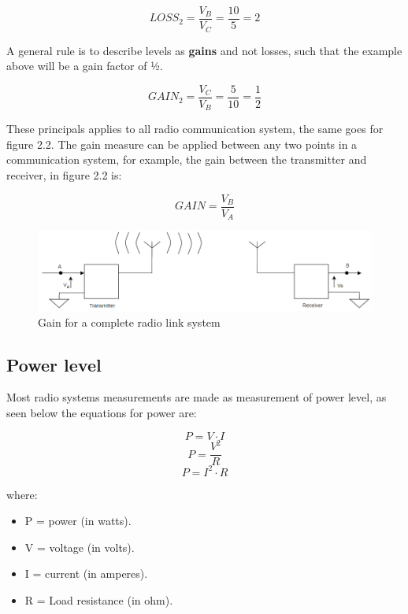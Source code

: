$$LOSS_2 = \frac{V_B}{V_C} = \frac{10}{5} = 2$$

A general rule is to describe levels as \textbf{gains} and not losses, such that the example above will be a gain factor of ½.

$$GAIN_2 = \frac{V_C}{V_B} = \frac{5}{10} = \frac{1}{2}$$

These principals applies to all radio communication system, the same goes for figure 2.2. The gain measure can be applied between any two points in a communication system, for example, the gain between the transmitter and receiver, in figure 2.2 is:

$$GAIN = \frac{V_B}{V_A}$$

\begin{figure}[h]
\centering
\includegraphics[scale=0.55]{figures/RadioCom.PNG}
\caption{Gain for a complete radio link system}
\end{figure}

\subsection{Power level}
Most radio systems measurements are made as measurement of power level, as seen below the equations for power are:

\begin{equation}
    P = V \cdot I
\end{equation}
\begin{equation}
    P = \frac{V^2}{R}
\end{equation}
\begin{equation}
    P = I^2 \cdot R
\end{equation}

where:

\begin{itemize}
    \item P = power (in watts).
    \item V = voltage (in volts).
    \item I = current (in amperes).
    \item R = Load resistance (in ohm).
\end{itemize}

